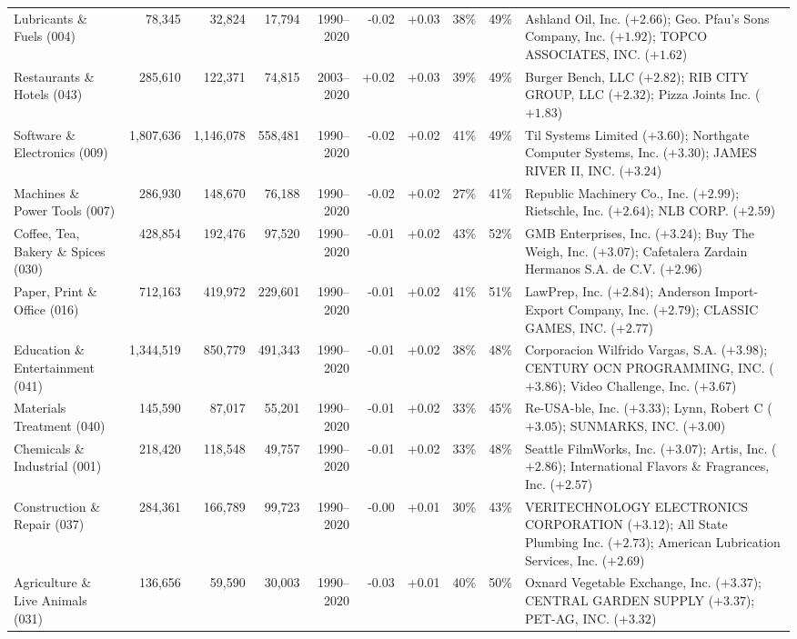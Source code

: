 {\begin{tabular}{l rrrr rr rr >{\raggedright\arraybackslash}p{8.5cm}}
Lubricants \& Fuels (004) & 78,345 & 32,824 & 17,794 & 1990--2020 & -0.02 & +0.03 & 38\% & 49\% & Ashland Oil, Inc. ($+2.66$); Geo. Pfau's Sons Company, Inc. ($+1.92$); TOPCO ASSOCIATES, INC. ($+1.62$) \\
Restaurants \& Hotels (043) & 285,610 & 122,371 & 74,815 & 2003--2020 & +0.02 & +0.03 & 39\% & 49\% & Burger Bench, LLC ($+2.82$); RIB CITY GROUP, LLC ($+2.32$); Pizza Joints Inc. ($+1.83$) \\
Software \& Electronics (009) & 1,807,636 & 1,146,078 & 558,481 & 1990--2020 & -0.02 & +0.02 & 41\% & 49\% & Til Systems Limited ($+3.60$); Northgate Computer Systems, Inc. ($+3.30$); JAMES RIVER II, INC. ($+3.24$) \\
Machines \& Power Tools (007) & 286,930 & 148,670 & 76,188 & 1990--2020 & -0.02 & +0.02 & 27\% & 41\% & Republic Machinery Co., Inc. ($+2.99$); Rietschle, Inc. ($+2.64$); NLB CORP. ($+2.59$) \\
Coffee, Tea, Bakery \& Spices (030) & 428,854 & 192,476 & 97,520 & 1990--2020 & -0.01 & +0.02 & 43\% & 52\% & GMB Enterprises, Inc. ($+3.24$); Buy The Weigh, Inc. ($+3.07$); Cafetalera Zardain Hermanos S.A. de C.V. ($+2.96$) \\
Paper, Print \& Office (016) & 712,163 & 419,972 & 229,601 & 1990--2020 & -0.01 & +0.02 & 41\% & 51\% & LawPrep, Inc. ($+2.84$); Anderson Import-Export Company, Inc. ($+2.79$); CLASSIC GAMES, INC. ($+2.77$) \\
Education \& Entertainment (041) & 1,344,519 & 850,779 & 491,343 & 1990--2020 & -0.01 & +0.02 & 38\% & 48\% & Corporacion Wilfrido Vargas, S.A. ($+3.98$); CENTURY OCN PROGRAMMING, INC. ($+3.86$); Video Challenge, Inc. ($+3.67$) \\
Materials Treatment (040) & 145,590 & 87,017 & 55,201 & 1990--2020 & -0.01 & +0.02 & 33\% & 45\% & Re-USA-ble, Inc. ($+3.33$); Lynn, Robert C ($+3.05$); SUNMARKS, INC. ($+3.00$) \\
Chemicals \& Industrial (001) & 218,420 & 118,548 & 49,757 & 1990--2020 & -0.01 & +0.02 & 33\% & 48\% & Seattle FilmWorks, Inc. ($+3.07$); Artis, Inc. ($+2.86$); International Flavors \& Fragrances, Inc. ($+2.57$) \\
Construction \& Repair (037) & 284,361 & 166,789 & 99,723 & 1990--2020 & -0.00 & +0.01 & 30\% & 43\% & VERITECHNOLOGY ELECTRONICS CORPORATION ($+3.12$); All State Plumbing Inc. ($+2.73$); American Lubrication Services, Inc. ($+2.69$) \\
Agriculture \& Live Animals (031) & 136,656 & 59,590 & 30,003 & 1990--2020 & -0.03 & +0.01 & 40\% & 50\% & Oxnard Vegetable Exchange, Inc. ($+3.37$); CENTRAL GARDEN SUPPLY ($+3.37$); PET-AG, INC. ($+3.32$) \\

\end{tabular}}
